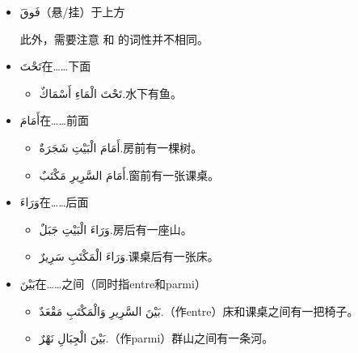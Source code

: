 \begin{itemize}
    \item \ac{فَوقَ}{（悬/挂）于上方}
    
    \begin{center}
        
        
    \end{center}
    
    \begin{attention}
        此外，需要注意  和  的词性并不相同。
    \end{attention}
    
    \item \ac{تَحْتَ}{在……下面}
    \begin{itemize}
        \item \ac{تَحْتَ الْمَاءِ أَسْمَاكٌ.}{水下有鱼。}
    \end{itemize}
    
    \item \ac{أَمَامَ}{在……前面}
    \begin{itemize}
        \item \ac{أَمَامَ الْبَيْتِ شَجَرَةٌ.}{房前有一棵树。}
        \item \ac{أَمَامَ السَّرِيرِ مَكْتَبٌ.}{窗前有一张课桌。}
    \end{itemize}

    \item \ac{وَرَاءَ}{在……后面}
    \begin{itemize}
        \item \ac{وَرَاءَ الْبَيْتِ جَبَلٌ.}{房后有一座山。}
        \item \ac{وَرَاءَ الْمَكْتَبِ سَرِيرٌ.}{课桌后有一张床。}
    \end{itemize}

    \item \ac{بَيْنَ}{在……之间（同时指entre和parmi）}
    \begin{itemize}
        \item \ac{بَيْنَ السَّرِيرِ وَالْمَكْتَبِ مَقْعَدٌ.}{（作entre）床和课桌之间有一把椅子。}
        \item \ac{بَيْنَ الْجِبَالِ نَهْرٌ.}{（作parmi）群山之间有一条河。}
    \end{itemize}
\end{itemize}

